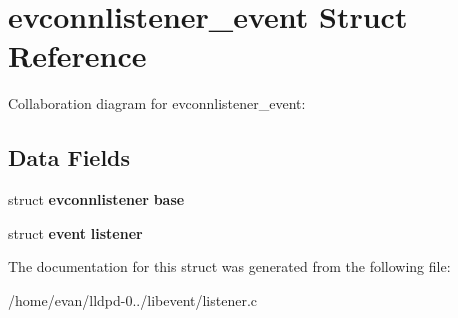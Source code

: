 \section{evconnlistener\-\_\-event \-Struct \-Reference}
\label{structevconnlistener__event}


\-Collaboration diagram for evconnlistener\-\_\-event\-:
\subsection*{\-Data \-Fields}
\begin{DoxyCompactItemize}
\item 
struct {\bf evconnlistener} {\bfseries base}\label{structevconnlistener__event_a6d7cc44f05f74a91bdf52a9e4d003e46}

\item 
struct {\bf event} {\bfseries listener}\label{structevconnlistener__event_ab41061d7c1bfe6d69bbf6a688786a15e}

\end{DoxyCompactItemize}


\-The documentation for this struct was generated from the following file\-:\begin{DoxyCompactItemize}
\item 
/home/evan/lldpd-\/0../libevent/listener.\-c\end{DoxyCompactItemize}
